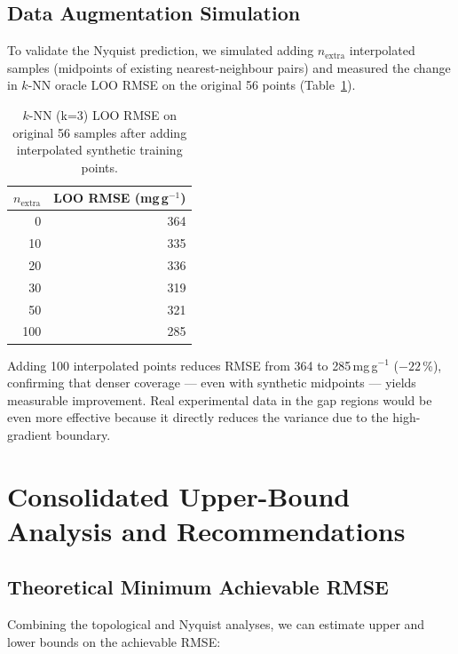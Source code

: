 \documentclass[12pt,a4paper]{article}
\begin{document}
\subsection{Data Augmentation Simulation}

To validate the Nyquist prediction, we simulated adding $n_\text{extra}$
interpolated samples (midpoints of existing nearest-neighbour pairs) and
measured the change in $k$-NN oracle LOO RMSE on the original 56 points
(Table~\ref{tab:augmentation}).

\begin{table}[h]
\centering
\caption{$k$-NN (k=3) LOO RMSE on original 56 samples after adding
  interpolated synthetic training points.}
\label{tab:augmentation}
\begin{tabular}{rr}
\toprule
$n_\text{extra}$ & LOO RMSE (mg\,g$^{-1}$) \\
\midrule
0   & 364 \\
10  & 335 \\
20  & 336 \\
30  & 319 \\
50  & 321 \\
100 & 285 \\
\bottomrule
\end{tabular}
\end{table}

Adding 100 interpolated points reduces RMSE from 364 to 285\,mg\,g$^{-1}$
($-22$\,\%), confirming that denser coverage — even with synthetic
midpoints — yields measurable improvement.  Real experimental data in
the gap regions would be even more effective because it directly reduces
the variance due to the high-gradient boundary.

\section{Consolidated Upper-Bound Analysis and Recommendations}
\label{sec:upper_bound}

\subsection{Theoretical Minimum Achievable RMSE}

Combining the topological and Nyquist analyses, we can estimate upper and
lower bounds on the achievable RMSE:
\end{document}
